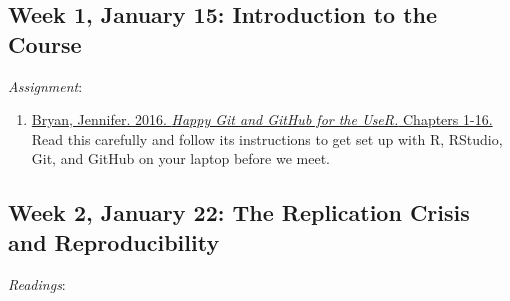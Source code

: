 \documentclass[]{article}
\providecommand{\tightlist}{%
  \setlength{\itemsep}{0pt}\setlength{\parskip}{0pt}}
\begin{document}
\hypertarget{week-1-january-15-introduction-to-the-course}{%
\subsection{Week 1, January 15: Introduction to the
Course}\label{week-1-january-15-introduction-to-the-course}}

\emph{Assignment}:

\begin{enumerate}
\def\labelenumi{\arabic{enumi}.}
\tightlist
\item
  \href{http://happygitwithr.com}{Bryan, Jennifer. 2016.
  \textit{Happy Git and GitHub for the UseR.} Chapters 1-16.} Read this
  carefully and follow its instructions to get set up with \textsf{R},
  RStudio, Git, and GitHub on your laptop before we meet.
\end{enumerate}

\hypertarget{week-2-january-22-the-replication-crisis-and-reproducibility}{%
\subsection{Week 2, January 22: The Replication Crisis and
Reproducibility}\label{week-2-january-22-the-replication-crisis-and-reproducibility}}

\emph{Readings}:
\end{document}
